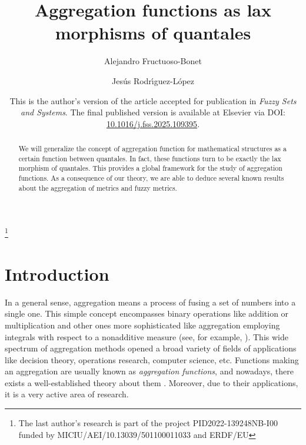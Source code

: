 \documentclass[11pt,a4paper]{amsart}
\theoremstyle{definition}
\begin{document}
	
	\title[Aggregation functions as lax morphisms of quantales]{Aggregation functions as lax morphisms of quantales}
	
	\author[A. Fructuoso-Bonet]{Alejandro Fructuoso-Bonet}
	\address[A. Fructuoso-Bonet]{Instituto Universitario de Matem\'atica Pura y Aplicada, Universitat Polit\`ecnica de Val\`encia, Camino de Vera s/n, 46022 Valencia, Spain}
	\author[J. Rodr\'{\i}guez-L\'opez]{Jes\'us Rodr\'{\i}guez-L\'opez}
	\address[J. Rodr\'{\i}guez-L\'opez]{Instituto Universitario de Matem\'atica Pura y Aplicada, Universitat Polit\`ecnica de Val\`encia, Camino de Vera s/n, 46022 Valencia, Spain}
	\thanks{The last author's research
		is part of the project PID2022-139248NB-I00 funded by MICIU/AEI/10.13039/501100011033 and ERDF/EU}
	
	
	
	
	
	\begin{abstract}
		We will generalize the concept of aggregation function for mathematical structures as a certain function between quantales. In fact, these functions turn to be exactly the lax morphism of quantales. This provides a global framework for the study of aggregation functions. As a consequence of our theory, we are able to deduce several known results about the aggregation of metrics and fuzzy metrics.
	\end{abstract}
	
	\date{This is the author's version of the article accepted for publication in \textit{Fuzzy Sets and Systems}. 
		The final published version is available at Elsevier via DOI: \href{https://doi.org/10.1016/j.fss.2025.109395}{10.1016/j.fss.2025.109395}.}
	\maketitle
	
	
	\section{Introduction}
	
	In a general sense, aggregation means a process of fusing a set of numbers into a single one. This simple concept encompasses binary operations like addition or multiplication and other ones more sophisticated like aggregation employing integrals with respect to a nonadditive measure (see, for example, \cite{BookGraMariMesiPap}). This wide spectrum of aggregation methods opened a broad variety of fields of applications like decision theory, operations research, computer science, etc. Functions making an aggregation are usually known as \emph{aggregation functions}, and nowadays, there exists a well-established theory about them \cite{BookBeliPraCalvo,BookGraMariMesiPap,BookTorraNaru}. Moreover, due to their applications, it is a very active area of research.
	
\end{document}

